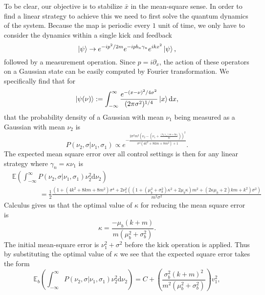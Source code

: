 \documentclass[superscriptaddress,aps,pra,nofootinbib,onecolumn,notitlepage,10pt]{revtex4-1}
\def\ket#1{\mathinner{|{#1}\rangle}}
\begin{document}
To be clear, our objective is to stabilize $\bar{x}$ in the mean-square sense.  In order to find a linear strategy to achieve this we need to first solve the quantum dynamics of the system.
Because the map is periodic every $1$ unit of time, we only have to consider the dynamics within a single kick and feedback
\begin{equation}
\ket{\psi} \rightarrow e^{-i p^2/2m}e^{-ipb_n \gamma_n} e^{i kx^2}\ket{\psi},
\end{equation}
followed by a measurement operation.  Since $p= i\partial_x$, the action of these operators on a Gaussian state can be easily computed by Fourier transformation.  We specifically find that for
\begin{equation}
\ket{\psi(\nu)}:=\int_{-\infty}^\infty \frac{e^{-(x-\nu)^2/4\sigma^2}}{(2\pi \sigma^2)^{1/4}}\ket{x}\mathrm{d}x,
\end{equation}
that the probability density of a Gaussian with mean $\nu_1$ being measured as a Gaussian with mean $\nu_2$ is 
\begin{equation}
P(\nu_2,\sigma|\nu_1,\sigma_1) \propto e^{-\frac{2\sigma^2 m^2 \left(\nu_2 -\left (\nu_1 + \frac{(b_n\gamma_n)m + k\nu_1}{m}\right)\right)^2}{\sigma^4(4k^2+8km+8m^2)+1}}.
\end{equation}
The expected mean square error over all control settings is then for any linear strategy where $\gamma_n = \kappa \nu_1$ is
\begin{align}
&\mathbb{E}\left(\int_{-\infty}^\infty P(\nu_2,\sigma|\nu_1,\sigma_1) \nu_2^2\mathrm{d}\nu_2\right) \nonumber\\
&\qquad\qquad= \frac{1}{2}\frac{(1+(4k^2+8km+8m^2)\sigma^4+2\nu_1^2((1+(\mu_b^2+\sigma_b^2)\kappa^2+2\mu_b\kappa)m^2+(2\kappa\mu_b+2)km+k^2)\sigma^2)}{m^2\sigma^2}\label{eq:mse}
\end{align}
Calculus gives us that the optimal value of $\kappa$ for reducing the mean square error is
\begin{equation}
\kappa = \frac{-\mu_b(k+m)}{m(\mu_b^2 +\sigma_b^2)}.
\end{equation}
The initial mean-square error is $\nu_1^2 +\sigma^2$ before the kick operation is applied.  Thus by substituting the optimal value of $\kappa$ we see that the expected square error takes the form
\begin{equation}
\mathbb{E}_{b}\left(\int_{-\infty}^\infty P(\nu_2,\sigma|\nu_1,\sigma_1) \nu_2^2\mathrm{d}\nu_2\right) = C + \left(\frac{\sigma_b^2(k+m)^2}{m^2(\mu_b^2+\sigma_b^2)}\right)v_1^2,
\end{equation}
\end{document}
